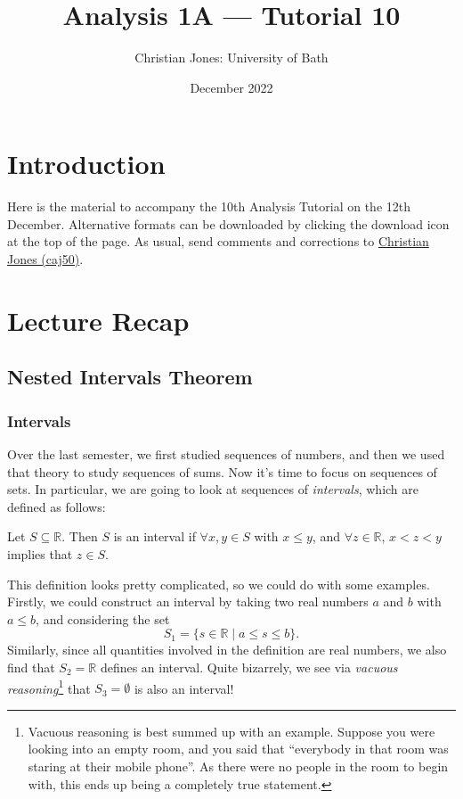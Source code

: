 \documentclass[
  10pt,
  a4paper]{article}
\title{Analysis 1A --- Tutorial 10}
\author{Christian Jones: University of Bath}
\date{December 2022}
\theoremstyle{plain}
\theoremstyle{plain}
\theoremstyle{plain}
\theoremstyle{plain}
\theoremstyle{plain}
\theoremstyle{definition}
\theoremstyle{definition}
\theoremstyle{definition}
\theoremstyle{remark}
\let\BeginKnitrBlock\begin \let\EndKnitrBlock\end
\begin{document}
\maketitle

{
\setcounter{tocdepth}{2}
\tableofcontents
}
\newpage
{}

\hypertarget{introduction}{%
\section*{Introduction}\label{introduction}}

Here is the material to accompany the 10th Analysis Tutorial on the 12th December. Alternative formats can be downloaded by clicking the download icon at the top of the page. As usual, send comments and corrections to \href{mailto:caj50@bath.ac.uk}{Christian Jones (caj50)}.

\hypertarget{lecture-recap}{%
\section{Lecture Recap}\label{lecture-recap}}

\hypertarget{nested-intervals-theorem}{%
\subsection{Nested Intervals Theorem}\label{nested-intervals-theorem}}

\hypertarget{intervals}{%
\subsubsection{Intervals}\label{intervals}}

Over the last semester, we first studied sequences of numbers, and then we used that theory to study sequences of sums. Now it's time to focus on sequences of sets. In particular, we are going to look at sequences of \emph{intervals}, which are defined as follows:

\BeginKnitrBlock{definition}[Interval]
{\label{def:def1} }Let \(S \subseteq \mathbb{R}\). Then \(S\) is an interval if \(\forall x,y \in S\) with \(x \leq y\), and \(\forall z \in \mathbb{R}\), \(x < z < y\) implies that \(z \in S\).
\EndKnitrBlock{definition}
This definition looks pretty complicated, so we could do with some examples. Firstly, we could construct an interval by taking two real numbers \(a\) and \(b\) with \(a \leq b\), and considering the set \[S_1 = \lbrace s \in \mathbb{R}\; \lvert\; a \leq s \leq b \rbrace.\] Similarly, since all quantities involved in the definition are real numbers, we also find that \(S_2 = \mathbb{R}\) defines an interval. Quite bizarrely, we see via \emph{vacuous reasoning}\footnote{Vacuous reasoning is best summed up with an example. Suppose you were looking into an empty room, and you said that ``everybody in that room was staring at their mobile phone''. As there were no people in the room to begin with, this ends up being a completely true statement.} that \(S_3 = \emptyset\) is also an interval!
\end{document}
